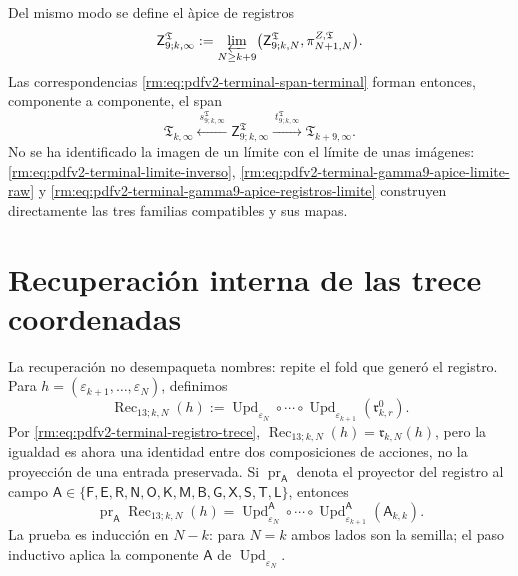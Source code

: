 Del mismo modo se define el \`apice de registros
\begin{equation}
\label{rm:eq:pdfv2-terminal-gamma9-apice-registros-limite}
 \mathsf Z^{\mathfrak T}_{9;k,\infty}
 :=\varprojlim_{N\geq k+9}
 \bigl(\mathsf Z^{\mathfrak T}_{9;k,N},
       \pi^{Z,\mathfrak T}_{N+1,N}\bigr).
\end{equation}
Las correspondencias
\eqref{rm:eq:pdfv2-terminal-span-terminal} forman entonces, componente a
componente, el span
\begin{equation}
\label{rm:eq:pdfv2-terminal-span-limite}
 \mathfrak T_{k,\infty}
 \xleftarrow{\ s^{\mathfrak T}_{9;k,\infty}\ }
 \mathsf Z^{\mathfrak T}_{9;k,\infty}
 \xrightarrow{\ t^{\mathfrak T}_{9;k,\infty}\ }
 \mathfrak T_{k+9,\infty}.
\end{equation}
No se ha identificado la imagen de un l\'imite con el l\'imite de unas
im\'agenes: \eqref{rm:eq:pdfv2-terminal-limite-inverso},
\eqref{rm:eq:pdfv2-terminal-gamma9-apice-limite-raw} y
\eqref{rm:eq:pdfv2-terminal-gamma9-apice-registros-limite} construyen
directamente las tres familias compatibles y sus mapas.

\section{Recuperaci\'on interna de las trece coordenadas}

La recuperaci\'on no desempaqueta nombres: repite el fold que gener\'o el
registro. Para
\(h=(\varepsilon_{k+1},\ldots,\varepsilon_N)\), definimos
\begin{equation}
\label{rm:eq:pdfv2-terminal-recuperacion-trece}
 \boxed{
 \operatorname{Rec}_{13;k,N}(h):=
 \operatorname{Upd}_{\varepsilon_N}\circ\cdots\circ
 \operatorname{Upd}_{\varepsilon_{k+1}}
 (\mathfrak r^0_{k,r}).}
\end{equation}
Por \eqref{rm:eq:pdfv2-terminal-registro-trece},
\(\operatorname{Rec}_{13;k,N}(h)=\mathfrak r_{k,N}(h)\), pero la igualdad
es ahora una identidad entre dos composiciones de acciones, no la
proyecci\'on de una entrada preservada. Si
\(\operatorname{pr}_{\mathsf A}\) denota el proyector del registro al campo
\(\mathsf A\in\{\mathsf F,\mathsf E,\mathsf R,\mathsf N,\mathsf O,
\mathsf K,\mathsf M,\mathsf B,\mathsf G,\mathsf X,\mathsf S,\mathsf T,
\mathsf L\}\), entonces
\begin{equation}
\label{rm:eq:pdfv2-terminal-recuperacion-campo-fold}
 \operatorname{pr}_{\mathsf A}\operatorname{Rec}_{13;k,N}(h)
 =\operatorname{Upd}^{\mathsf A}_{\varepsilon_N}\circ\cdots\circ
  \operatorname{Upd}^{\mathsf A}_{\varepsilon_{k+1}}
  (\mathsf A_{k,k}).
\end{equation}
La prueba es inducci\'on en \(N-k\): para \(N=k\) ambos lados son la
semilla; el paso inductivo aplica la componente \(\mathsf A\) de
\(\operatorname{Upd}_{\varepsilon_N}\).

